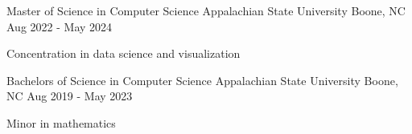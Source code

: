 


\begin{cventries}

  \cventry
    {Master of Science in Computer Science} %
    {Appalachian State University} %
    {Boone, NC} %
    {Aug 2022 - May 2024} %
    {
      \begin{cvitems} %
        \item {Concentration in data science and visualization}
      \end{cvitems}
    }
    
  \cventry
    {Bachelors of Science in Computer Science} %
    {Appalachian State University} %
    {Boone, NC} %
    {Aug 2019 - May 2023} %
    {
      \begin{cvitems} %
        \item {Minor in mathematics}
      \end{cvitems}
    }
\end{cventries}
